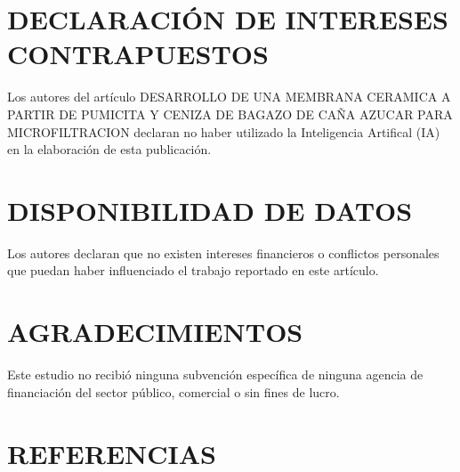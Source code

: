 \documentclass{article}
\begin{document}
\section{DECLARACIÓN DE INTERESES CONTRAPUESTOS}

Los autores del artículo DESARROLLO DE UNA MEMBRANA CERAMICA A PARTIR DE PUMICITA Y CENIZA DE BAGAZO DE CAÑA AZUCAR PARA MICROFILTRACION 
declaran no haber utilizado la Inteligencia Artifical (IA) en la elaboración de esta publicación. 

\section{DISPONIBILIDAD DE DATOS}

Los autores declaran que no existen intereses financieros o conflictos personales que puedan haber influenciado el trabajo reportado en este artículo.

\section{AGRADECIMIENTOS}

Este estudio no recibió ninguna subvención específica de ninguna agencia de financiación del sector público, comercial o sin fines de lucro. 

\section{REFERENCIAS}

\printbibliography
\end{document}
